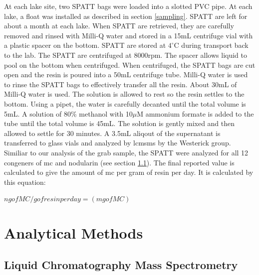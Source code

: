 At each lake site, two SPATT bags were loaded into a slotted PVC pipe. At each lake, a float was installed as described in section \ref{sampling}. SPATT are left for about a month at each lake. When SPATT are retrieved, they are carefully removed and rinsed with Milli-Q water and stored in a 15mL centrifuge vial with a plastic spacer on the bottom. SPATT are stored at $4^\circ$C during transport back to the lab. The SPATT are centrifuged at 8000rpm. The spacer allows liquid to pool on the bottom when centrifuged. When centrifuged, the SPATT bags are cut open and the resin is poured into a 50mL centrifuge tube. Milli-Q water is used to rinse the SPATT bags to effectively transfer all the resin. About 30mL of Milli-Q water is used. The solution is allowed to rest so the resin settles to the bottom. Using a pipet, the water is carefully decanted until the total volume is 5mL.  A solution of 80\% methanol with 10$\mu$M ammonium formate is added to the tube until the total volume is 45mL. The solution is gently mixed and then allowed to settle for 30 minutes. A 3.5mL aliqout of the supernatant is transferred to glass vials and analyzed by \gls{lcmsms} by the Westerick group. Similiar to our analysis of the grab sample, the SPATT were analyzed for all 12 congeners of \gls{mc} and nodularin (see section \ref{sc:lcms}). The final reported value is calculated to give the amount of \gls{mc} per gram of resin per day. It is calculated by this equation:

\begin {center} 
$ng of MC/g of resin per day = (mg of MC)$
\end{center}

\section{Analytical Methods}
\subsection{Liquid Chromatography Mass Spectrometry} \label{sc:lcms}

